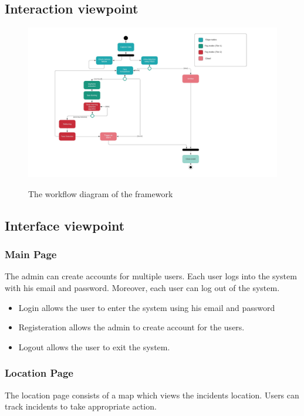 \documentclass[12pt]{article}
\begin{document}
\subsection{Interaction viewpoint}
\begin{figure}[h]
  \centering
  \includegraphics[width=19cm]{Activity diagram .jpeg}
  \label{fig:2}
   \caption{The workflow diagram of the framework}
\end{figure}

\newpage

\subsection{Interface viewpoint}
\subsubsection{Main Page}
The admin can create accounts for multiple users. Each user logs into the system with his email and password. Moreover, each user can log out of the system.
\begin{itemize}
    \item Login allows the user to enter the system using his email and password
    \item Registeration allows the admin to create account for the users.
    \item Logout allows the user to exit the system.
\end{itemize}

\subsubsection{Location Page}
The location page consists of a map which views the incidents location. Users can track incidents to take appropriate action.
\end{document}
